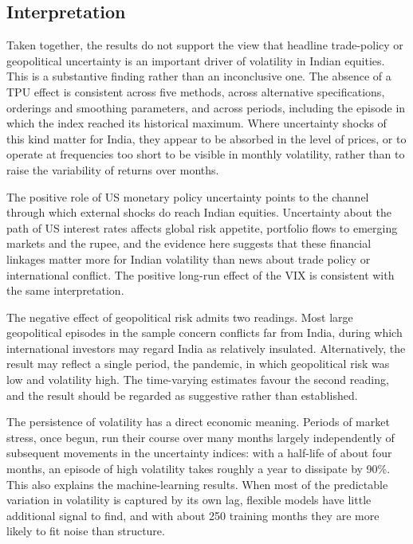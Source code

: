 \documentclass[10pt,twocolumn,a4paper]{article}
\begin{document}
\subsection{Interpretation}

Taken together, the results do not support the view that headline trade-policy or geopolitical uncertainty is an important driver of volatility in Indian equities. This is a substantive finding rather than an inconclusive one. The absence of a TPU effect is consistent across five methods, across alternative specifications, orderings and smoothing parameters, and across periods, including the episode in which the index reached its historical maximum. Where uncertainty shocks of this kind matter for India, they appear to be absorbed in the level of prices, or to operate at frequencies too short to be visible in monthly volatility, rather than to raise the variability of returns over months.

The positive role of US monetary policy uncertainty points to the channel through which external shocks do reach Indian equities. Uncertainty about the path of US interest rates affects global risk appetite, portfolio flows to emerging markets and the rupee, and the evidence here suggests that these financial linkages matter more for Indian volatility than news about trade policy or international conflict. The positive long-run effect of the VIX is consistent with the same interpretation.

The negative effect of geopolitical risk admits two readings. Most large geopolitical episodes in the sample concern conflicts far from India, during which international investors may regard India as relatively insulated. Alternatively, the result may reflect a single period, the pandemic, in which geopolitical risk was low and volatility high. The time-varying estimates favour the second reading, and the result should be regarded as suggestive rather than established.

The persistence of volatility has a direct economic meaning. Periods of market stress, once begun, run their course over many months largely independently of subsequent movements in the uncertainty indices: with a half-life of about four months, an episode of high volatility takes roughly a year to dissipate by 90\%. This also explains the machine-learning results. When most of the predictable variation in volatility is captured by its own lag, flexible models have little additional signal to find, and with about 250 training months they are more likely to fit noise than structure.
\end{document}
